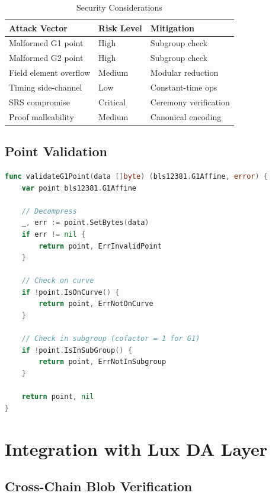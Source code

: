 \documentclass[11pt,a4paper]{article}
\theoremstyle{definition}
\begin{document}
\begin{table}[h]
\centering
\caption{Security Considerations}
\begin{tabular}{lll}
\toprule
Attack Vector & Risk Level & Mitigation \\
\midrule
Malformed G1 point & High & Subgroup check \\
Malformed G2 point & High & Subgroup check \\
Field element overflow & Medium & Modular reduction \\
Timing side-channel & Low & Constant-time ops \\
SRS compromise & Critical & Ceremony verification \\
Proof malleability & Medium & Canonical encoding \\
\bottomrule
\end{tabular}
\end{table}

\subsection{Point Validation}

\begin{lstlisting}[language=Go, caption={BLS12-381 Point Validation}]
func validateG1Point(data []byte) (bls12381.G1Affine, error) {
    var point bls12381.G1Affine

    // Decompress
    _, err := point.SetBytes(data)
    if err != nil {
        return point, ErrInvalidPoint
    }

    // Check on curve
    if !point.IsOnCurve() {
        return point, ErrNotOnCurve
    }

    // Check in subgroup (cofactor = 1 for G1)
    if !point.IsInSubGroup() {
        return point, ErrNotInSubgroup
    }

    return point, nil
}
\end{lstlisting}

\section{Integration with Lux DA Layer}

\subsection{Cross-Chain Blob Verification}
\end{document}
